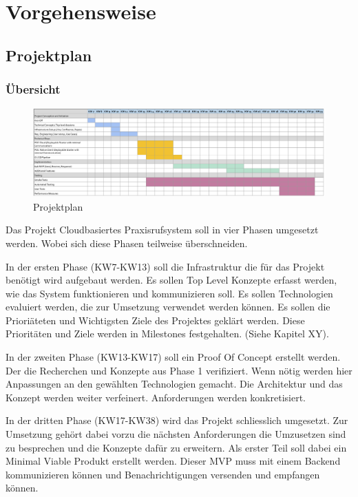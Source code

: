\section{Vorgehensweise}\label{sec:vorgehensweise}

\subsection{Projektplan}\label{subsec:projektplan}

\subsubsection*{Übersicht}
\begin{figure}[h]
    \label{fig:projectPlan}
    \includegraphics[width=\linewidth]{graphics/Projectplanning}\caption[Projektplan]{Projektplan}
\end{figure}

Das Projekt Cloudbasiertes Praxisrufsystem soll in vier Phasen umgesetzt werden.
Wobei sich diese Phasen teilweise überschneiden.

In der ersten Phase (KW7-KW13) soll die Infrastruktur die für das Projekt benötigt wird aufgebaut werden.
Es sollen Top Level Konzepte erfasst werden, wie das System funktionieren und kommunizieren soll.
Es sollen Technologien evaluiert werden, die zur Umsetzung verwendet werden können.
Es sollen die Prioriäteten und Wichtigsten Ziele des Projektes geklärt werden.
Diese Prioritäten und Ziele werden in Milestones festgehalten. (Siehe Kapitel XY).

In der zweiten Phase (KW13-KW17) soll ein Proof Of Concept erstellt werden.
Der die Recherchen und Konzepte aus Phase 1 verifiziert.
Wenn nötig werden hier Anpassungen an den gewählten Technologien gemacht.
Die Architektur und das Konzept werden weiter verfeinert.
Anforderungen werden konkretisiert.

In der dritten Phase (KW17-KW38) wird das Projekt schliesslich umgesetzt.
Zur Umsetzung gehört dabei vorzu die nächsten Anforderungen die Umzusetzen sind zu besprechen und die Konzepte dafür zu erweitern.
Als erster Teil soll dabei ein Minimal Viable Produkt erstellt werden.
Dieser MVP muss mit einem Backend kommunizieren können und Benachrichtigungen versenden und empfangen können.

